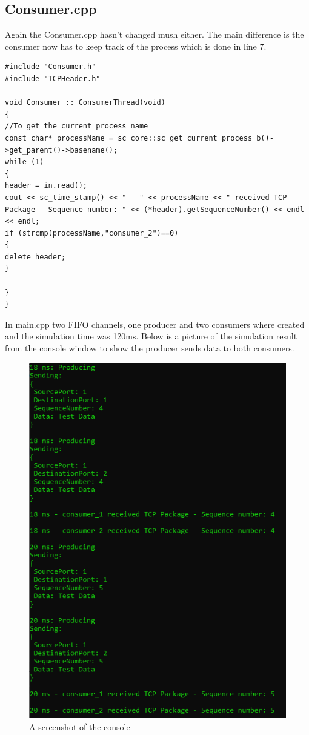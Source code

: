 \subsection{Consumer.cpp}
Again the Consumer.cpp hasn't changed mush either. The main difference is the consumer now has to keep track of the process which is done in line 7.
\begin{lstlisting}
#include "Consumer.h"
#include "TCPHeader.h"

void Consumer :: ConsumerThread(void)
{
//To get the current process name
const char* processName = sc_core::sc_get_current_process_b()->get_parent()->basename();
while (1)
{
header = in.read();
cout << sc_time_stamp() << " - " << processName << " received TCP Package - Sequence number: " << (*header).getSequenceNumber() << endl << endl;
if (strcmp(processName,"consumer_2")==0)
{
delete header;
}

}
}
\end{lstlisting}

In main.cpp two FIFO channels, one producer and two consumers where created and the simulation time was 120ms. Below is a picture of the simulation result from the console window to show the producer sends data to both consumers. 


\begin{figure}[H]
	\centering
	\includegraphics[width=\textwidth]{Images/ConsoleWindow3_3_2.png}
	\caption{A screenshot of the console}
	\label{fig:ConsoleWindow_3_3_2}
\end{figure}



